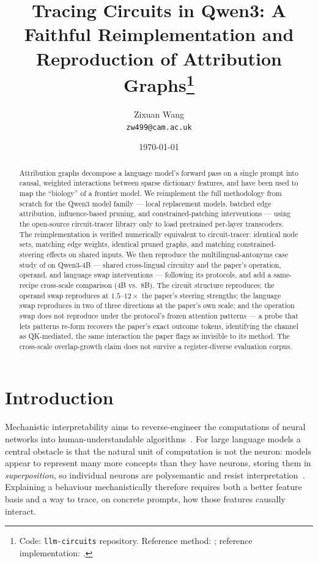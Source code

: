 \documentclass[11pt,a4paper]{article}
\title{Tracing Circuits in Qwen3: A Faithful Reimplementation and Reproduction of Attribution Graphs\thanks{Code: \texttt{llm-circuits} repository. Reference method: \citet{ameisen2025circuit}; reference implementation: \citet{hanna2025circuittracer}.}}
\author{Zixuan Wang\\ \small \texttt{zw499@cam.ac.uk}}
\date{\today}
\begin{document}
\maketitle

\begin{abstract}
\noindent
Attribution graphs decompose a language model's forward pass on a single prompt into
causal, weighted interactions between sparse dictionary features, and have been used to
map the ``biology'' of a frontier model. We reimplement the full methodology from
scratch for the Qwen3 model family --- local replacement models, batched edge
attribution, influence-based pruning, and constrained-patching interventions --- using
the open-source \mbox{circuit-tracer} library only to load pretrained per-layer
transcoders. The reimplementation is verified numerically equivalent to
circuit-tracer: identical node sets, matching edge weights, identical pruned graphs,
and matching constrained-steering effects on shared inputs. We then reproduce the multilingual-antonyms
case study of \citet{lindsey2025biology} on Qwen3-4B --- shared cross-lingual
circuitry and the paper's operation, operand, and language swap interventions ---
following its protocols, and add a same-recipe cross-scale comparison (4B vs.\ 8B).
The circuit structure reproduces; the operand swap reproduces at $1.5$--$12\times$ the
paper's steering strengths; the language swap reproduces in two of three directions at
the paper's own scale; and the operation swap does not reproduce under the protocol's
frozen attention patterns --- a probe that lets patterns re-form recovers the paper's
exact outcome tokens, identifying the channel as QK-mediated, the same interaction the
paper flags as invisible to its method. The cross-scale overlap-growth claim does not
survive a register-diverse evaluation corpus.
\end{abstract}

\section{Introduction}\label{sec:intro}

Mechanistic interpretability aims to reverse-engineer the computations of neural
networks into human-understandable algorithms~\citep{olah2020zoom,elhage2021mathematical}.
For large language models a central obstacle is that the natural unit of computation is
not the neuron: models appear to represent many more concepts than they have neurons,
storing them in \emph{superposition}, so individual neurons are polysemantic and
resist interpretation~\citep{elhage2022superposition}. Explaining a behaviour
mechanistically therefore requires both a better feature basis and a way to trace, on
concrete prompts, how those features causally interact.
\end{document}

